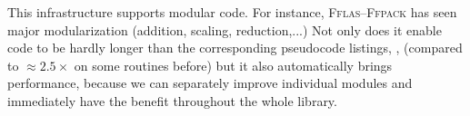\documentclass[a4paper]{article}
\def\scsf#1{{\scshape \biolinum #1}} %
\def\ldots{...}
\newcommand\fflasffpack{\scsf{Fflas--Ffpack}\xspace}
\newcommand{\eg}{\mbox{\emph{e.g.}}\xspace}
\begin{document}
%
%
\par
%
This infrastructure supports modular code. For instance,
\fflasffpack has seen major  modularization (addition, scaling,
reduction,\ldots) Not only does it enable code to be hardly longer than
the corresponding pseudocode listings, \cite{Boyer:2009:sched}, (compared to
$\approx 2.5\times$ on some routines before) but it also automatically brings
performance, because we can separately improve individual modules and
immediately have the benefit throughout the whole library.
%
\end{document}

